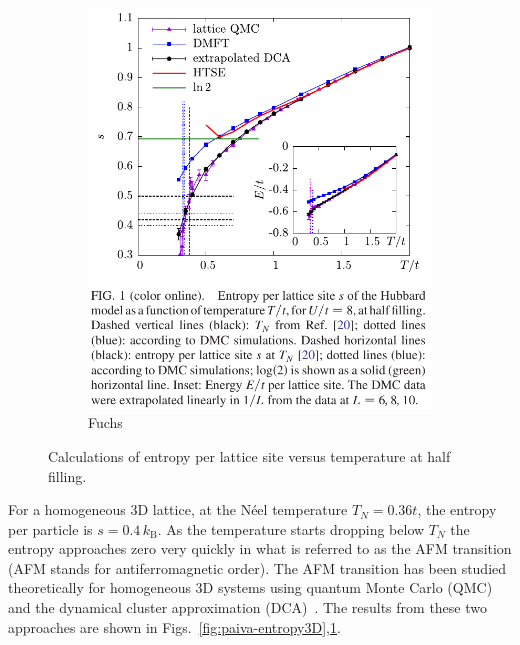 \documentclass[11pt,letter]{article}
\newcommand{\kb}{\ensuremath{k_{\text{B}}}}
\begin{document}
\begin{figure}
        \begin{subfigure}[b]{0.48\textwidth}
                \includegraphics[width=\textwidth]{figures/fuchs_entropy.png}
                \caption{Fuchs~\cite{Fuchs2011}}
                \label{fig:fuchs-entropy3D}
        \end{subfigure}%
        \caption{Calculations of entropy per lattice site versus temperature at half filling.}\label{fig:entropy-Fuchs-Paiva}
\end{figure}
For a homogeneous 3D lattice, at the N\'{e}el temperature $T_{N}=0.36t$, the
entropy per particle is $s=0.4\,\kb$.  As the temperature starts dropping below
$T_{N}$ the entropy approaches zero very quickly in what is referred to as the
AFM transition (AFM stands for antiferromagnetic order).  The AFM transition
has been studied theoretically for homogeneous 3D systems using  quantum
Monte Carlo (QMC)~\cite{Paiva2011} and the dynamical cluster approximation
(DCA)~\cite{Fuchs2011}.  The results from these two approaches are shown in
Figs.~\ref{fig:paiva-entropy3D},\ref{fig:fuchs-entropy3D}.
\end{document}
